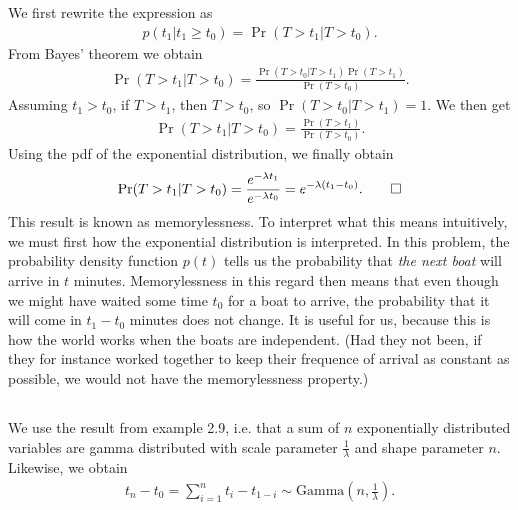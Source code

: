 \documentclass[]{article}
\begin{document}
\section{}
\subsection{}
We first rewrite the expression as
\begin{equation}\begin{aligned}
p(t_1|t_1 \geq t_0) = \Pr(T>t_1|T>t_0).
\end{aligned}\end{equation}
From Bayes' theorem we obtain
\begin{equation}\begin{aligned}
\Pr(T>t_1|T>t_0) = \frac{\Pr(T>t_0|T>t_1)\Pr(T>t_1)}{\Pr(T>t_0)}.
\end{aligned}\end{equation}
Assuming $t_1 > t_0$, if $T>t_1$, then $T>t_0$, so $\Pr(T>t_0|T>t_1) = 1$. We then get
\begin{equation}\begin{aligned}
\Pr(T> t_1|T>t_0) = \frac{\Pr(T>t_1)}{\Pr(T>t_0)}.
\end{aligned}\end{equation}
Using the pdf of the exponential distribution, we finally obtain
\begin{equation}\begin{aligned}
\Pr(T> t_1|T>t_0) = \frac{e^{-\lambda t_1}}{e^{-\lambda t_0}} = e^{-\lambda(t_1-t_0)}. \qed
\end{aligned}\end{equation}
This result is known as memorylessness. To interpret what this means intuitively, we must first how the exponential distribution is interpreted. In this problem, the probability density function $p(t)$ tells us the probability that \textit{the next boat} will arrive in $t$ minutes. Memorylessness in this regard then means that even though we might have waited some time $t_0$ for a boat to arrive, the probability that it will come in $t_1 - t_0$ minutes does not change. It is useful for us, because this is how the world works when the boats are independent. (Had they not been, if they for instance worked together to keep their frequence of arrival as constant as possible, we would not have the memorylessness property.)

\subsection{}
We use the result from example 2.9, i.e. that a sum of $n$ exponentially distributed variables are gamma distributed with scale parameter $\frac{1}{\lambda}$ and shape parameter $n$. Likewise, we obtain
\begin{equation}\begin{aligned}
t_n - t_0 = \sum_{i=1}^{n}t_i-t_{1-i} \sim \text{Gamma}(n, \frac{1}{\lambda}).
\end{aligned}\end{equation}
\end{document}
